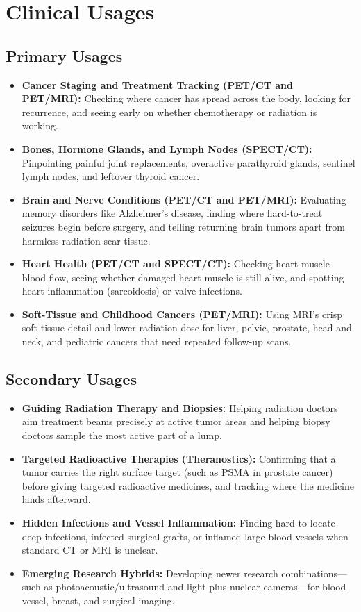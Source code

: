 \section{Clinical Usages}

\subsection{Primary Usages}
\begin{itemize}
    \item \textbf{Cancer Staging and Treatment Tracking (PET/CT and PET/MRI):} Checking where cancer has spread across the body, looking for recurrence, and seeing early on whether chemotherapy or radiation is working.
    \item \textbf{Bones, Hormone Glands, and Lymph Nodes (SPECT/CT):} Pinpointing painful joint replacements, overactive parathyroid glands, sentinel lymph nodes, and leftover thyroid cancer.
    \item \textbf{Brain and Nerve Conditions (PET/CT and PET/MRI):} Evaluating memory disorders like Alzheimer's disease, finding where hard-to-treat seizures begin before surgery, and telling returning brain tumors apart from harmless radiation scar tissue.
    \item \textbf{Heart Health (PET/CT and SPECT/CT):} Checking heart muscle blood flow, seeing whether damaged heart muscle is still alive, and spotting heart inflammation (sarcoidosis) or valve infections.
    \item \textbf{Soft-Tissue and Childhood Cancers (PET/MRI):} Using MRI's crisp soft-tissue detail and lower radiation dose for liver, pelvic, prostate, head and neck, and pediatric cancers that need repeated follow-up scans.
\end{itemize}

\subsection{Secondary Usages}
\begin{itemize}
    \item \textbf{Guiding Radiation Therapy and Biopsies:} Helping radiation doctors aim treatment beams precisely at active tumor areas and helping biopsy doctors sample the most active part of a lump.
    \item \textbf{Targeted Radioactive Therapies (Theranostics):} Confirming that a tumor carries the right surface target (such as PSMA in prostate cancer) before giving targeted radioactive medicines, and tracking where the medicine lands afterward.
    \item \textbf{Hidden Infections and Vessel Inflammation:} Finding hard-to-locate deep infections, infected surgical grafts, or inflamed large blood vessels when standard CT or MRI is unclear.
    \item \textbf{Emerging Research Hybrids:} Developing newer research combinations---such as photoacoustic/ultrasound and light-plus-nuclear cameras---for blood vessel, breast, and surgical imaging.
\end{itemize}


